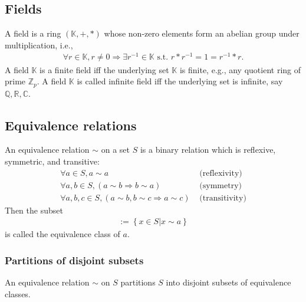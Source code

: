 \documentclass[11pt]{book}
\begin{document}

\subsection{Fields}
A field is a ring $(\mathbb{K},+,*)$ whose non-zero elements form an abelian group under multiplication, i.e.,
\begin{eqnarray}
\forall r \in \mathbb{K}, r \neq 0 \Rightarrow \exists r^{-1} \in \mathbb{K} \text{ s.t. } r*r^{-1} = 1 = r^{-1}*r.
\end{eqnarray}
A field $\mathbb{K}$ is a finite field iff the underlying set $\mathbb{K}$ is finite, e.g., any quotient ring of prime $\mathbb{Z}_p$.
A field $\mathbb{K}$ is called infinite field iff the underlying set is infinite, say $\mathbb{Q,R,C}$.



\subsection{Equivalence relations}
An equivalence relation $\sim$ on a set $S$ is a binary relation which is reflexive, symmetric, and transitive:
\begin{eqnarray}
\forall a \in S, a \sim a & \text{ (reflexivity)} \\
\forall a,b \in S, (a \sim b \Rightarrow b \sim a) & \text{ (symmetry)} \\
\forall a,b,c \in S, (a \sim b, b \sim c \Rightarrow a \sim c) & \text{ (transitivity)} 
\end{eqnarray}
Then the subset
\begin{eqnarray}
[a] := \left\{\left. x \in S \right| x \sim a \right\}
\end{eqnarray}
is called the equivalence class of $a$.

\subsubsection{Partitions of disjoint subsets}
An equivalence relation $\sim$ on $S$ partitions $S$ into disjoint subsets of equivalence classes.
\end{document}
